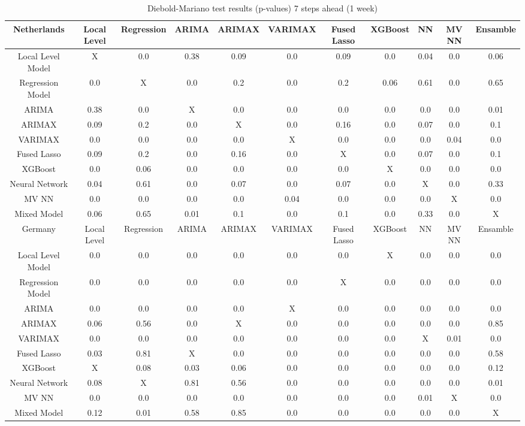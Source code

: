 \begin{landscape}
\pagestyle{empty}
\begin{table}[]
    \centering
    \begin{tabular}{|c|c c c c c c c c c c|}\hline
        Netherlands &  Local Level & Regression & ARIMA & ARIMAX & VARIMAX & Fused Lasso & XGBoost & NN & MV NN & Ensamble\\\hline
        Local Level Model & X & 0.0 & 0.38 & 0.09 & 0.0 & 0.09 & 0.0 & 0.04 & 0.0 & 0.06\\
        Regression Model & 0.0 & X & 0.0 & 0.2 & 0.0 & 0.2 & 0.06 & 0.61 & 0.0 & 0.65\\
        ARIMA & 0.38 & 0.0 & X & 0.0 & 0.0 & 0.0 & 0.0 & 0.0 & 0.0 & 0.01\\
        ARIMAX & 0.09 & 0.2 & 0.0 & X & 0.0 & 0.16 & 0.0 & 0.07 & 0.0 & 0.1\\
        VARIMAX & 0.0 & 0.0 & 0.0 & 0.0 & X & 0.0 & 0.0 & 0.0 & 0.04 & 0.0\\
        Fused Lasso & 0.09 & 0.2 & 0.0 & 0.16 & 0.0 & X & 0.0 & 0.07 & 0.0 & 0.1\\
        XGBoost & 0.0 & 0.06 & 0.0 & 0.0 & 0.0 & 0.0 & X & 0.0 & 0.0 & 0.0\\
        Neural Network & 0.04 & 0.61 & 0.0 & 0.07 & 0.0 & 0.07 & 0.0 & X & 0.0 & 0.33\\
        MV NN & 0.0 & 0.0 & 0.0 & 0.0 & 0.04 & 0.0 & 0.0 & 0.0 & X & 0.0\\
        Mixed Model & 0.06 & 0.65 & 0.01 & 0.1 & 0.0 & 0.1 & 0.0 & 0.33 & 0.0 & X\\
        \hline\hline
        Germany &  Local Level & Regression & ARIMA & ARIMAX & VARIMAX & Fused Lasso & XGBoost & NN & MV NN & Ensamble\\\hline
        Local Level Model & 0.0 & 0.0 & 0.0 & 0.0 & 0.0 & 0.0 & X & 0.0 & 0.0 & 0.0\\
        Regression Model & 0.0 & 0.0 & 0.0 & 0.0 & 0.0 & X & 0.0 & 0.0 & 0.0 & 0.0\\
        ARIMA & 0.0 & 0.0 & 0.0 & 0.0 & X & 0.0 & 0.0 & 0.0 & 0.0 & 0.0\\
        ARIMAX & 0.06 & 0.56 & 0.0 & X & 0.0 & 0.0 & 0.0 & 0.0 & 0.0 & 0.85\\
        VARIMAX & 0.0 & 0.0 & 0.0 & 0.0 & 0.0 & 0.0 & 0.0 & X & 0.01 & 0.0\\
        Fused Lasso & 0.03 & 0.81 & X & 0.0 & 0.0 & 0.0 & 0.0 & 0.0 & 0.0 & 0.58\\
        XGBoost & X & 0.08 & 0.03 & 0.06 & 0.0 & 0.0 & 0.0 & 0.0 & 0.0 & 0.12\\
        Neural Network & 0.08 & X & 0.81 & 0.56 & 0.0 & 0.0 & 0.0 & 0.0 & 0.0 & 0.01\\
        MV NN & 0.0 & 0.0 & 0.0 & 0.0 & 0.0 & 0.0 & 0.0 & 0.01 & X & 0.0\\
        Mixed Model & 0.12 & 0.01 & 0.58 & 0.85 & 0.0 & 0.0 & 0.0 & 0.0 & 0.0 & X\\
    \hline
    \end{tabular}
    \caption{Diebold-Mariano test results (p-values) 7 steps ahead (1 week)}
    \label{tab:1 week ahead diebold}
\end{table}
\end{landscape}

